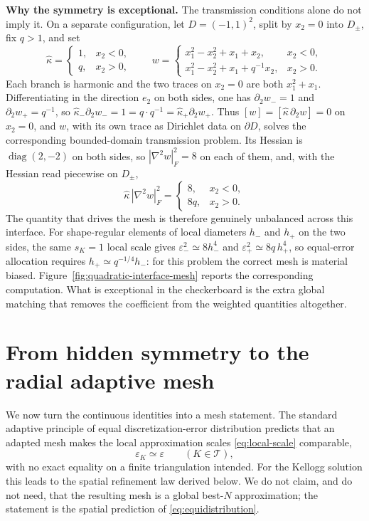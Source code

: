 \documentclass[10pt,pdftex]{amsart}%
\numberwithin{equation}{section}
\newcommand{\Tcal}{\mathcal{T}}
\begin{document}
\medskip \noindent\textbf{Why the symmetry is exceptional.} The transmission conditions alone do not imply it.  On a separate configuration, let $D=(-1,1)^2$, split by $x_2=0$ into $D_\pm$, fix $q>1$, and set
\[
  \widehat\kappa=\begin{cases}1,&x_2<0,\\ q,&x_2>0,\end{cases}
  \qquad
  w=\begin{cases}x_1^2-x_2^2+x_1+x_2,&x_2<0,\\ x_1^2-x_2^2+x_1+q^{-1}x_2,&x_2>0.\end{cases}
\]
Each branch is harmonic and the two traces on $x_2=0$ are both $x_1^2+x_1$.  Differentiating in the direction $e_2$ on both sides, one has $\partial_2w_-=1$ and $\partial_2w_+=q^{-1}$, so $\widehat\kappa_-\partial_2w_-=1=q\cdot q^{-1}=\widehat\kappa_+\partial_2w_+$.  Thus $[w]=[\widehat\kappa\,\partial_2w]=0$ on $x_2=0$, and $w$, with its own trace as Dirichlet data on $\partial D$, solves the corresponding bounded-domain transmission problem.  Its Hessian is $\operatorname{diag}(2,-2)$ on both sides, so $|\nabla^2w|_F^2=8$ on each of them, and, with the Hessian read piecewise on $D_\pm$,
\begin{equation}\label{eq:counterexample}
 \widehat\kappa\,|\nabla^2w|_F^2=
 \begin{cases}
 8,&x_2<0,\\
 8q,&x_2>0.
 \end{cases}
\end{equation}
The quantity that drives the mesh is therefore genuinely unbalanced across this interface.  For shape-regular elements of local diameters $h_-$ and $h_+$ on the two sides, the same $s_K=1$ local scale gives $\varepsilon_-^2\simeq8h_-^4$ and $\varepsilon_+^2\simeq8q\,h_+^4$, so equal-error allocation requires $h_+\simeq q^{-1/4}h_-$: for this problem the correct mesh is material biased.  Figure~\ref{fig:quadratic-interface-mesh} reports the corresponding computation.  What is exceptional in the checkerboard is the extra global matching that removes the coefficient from the weighted quantities altogether.

\section{From hidden symmetry to the radial adaptive mesh}
\label{sec:mesh}

We now turn the continuous identities into a mesh statement.  The standard adaptive principle of equal discretization-error distribution predicts that an adapted mesh makes the local approximation scales \eqref{eq:local-scale} comparable,
\begin{equation}\label{eq:equidistribution}
  \varepsilon_K\simeq\varepsilon
  \qquad(K\in\Tcal),
\end{equation}
with no exact equality on a finite triangulation intended.  For the Kellogg solution this leads to the spatial refinement law derived below.  We do not claim, and do not need, that the resulting mesh is a global best-$N$ approximation; the statement is the spatial prediction of \eqref{eq:equidistribution}.
\end{document}

